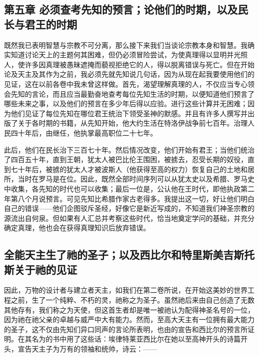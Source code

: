 
\subsection{第五章 必须查考先知的预言；论他们的时期，以及民长与君王的时期}

既然我已表明智慧与宗教不可分离，那么接下来我们当谈论宗教本身和智慧。我确实知道讨论天上的主题何其困难，但仍必须冒险尝试，为使真理得以显明并光照人，使许多因真理被愚昧遮掩而藐视拒绝它的人，得以脱离错误与死亡。但在开始论及天主及其作为之前，我必须先就先知说几句话，因为从现在起我要使用他们的见证，这在以前各卷中我未曾这样做。首先，渴望理解真理的人，不仅应当专心领会先知的言论，而且应当最勤奋地查考每位先知生活的时期，以便知道他们预言了哪些未来之事，以及他们的预言在多少年后得以应验。进行这些计算并无困难；因为他们见证了每位先知在哪位君王统治下领受圣神的默感。并且有许多人撰写并出版了关于各时期的书籍，从先知开始，他大约生活在特洛伊战争前七百年。治理人民四十年后，由继任，他执掌最高职位二十七年。\par

此后，他们在民长治下三百七十年。然后情况改变，他们开始有君王；当他们统治了四百五十年，直到王朝，犹太人被巴比伦王围困，被掳去，忍受长期的奴役，直到七十年后，被掳的犹太人才被波斯人（他获得至高的权力）恢复自己的土地和居所，当时在罗马是在位。因此，既然全部时间序列可以从犹太史以及希腊、罗马史中收集，各先知的时代也可以收集；最后一位是，公认他在王时代，即他执政第二年第八个月说预言。可见先知比希腊作家古老得多。我提出这一切，好让他们明白自己的错误——他们企图驳斥圣经，好像它是新近写成的，不知道我们神圣宗教的源流出自何泉。但如果有人汇总并考察这些时代，恰当地奠定学问的基础，并充分确定真理，他也会在获得真理知识后放弃错误。\par


\subsection{全能天主生了祂的圣子；以及西比尔和特里斯美吉斯托斯关于祂的见证}

因此，万物的设计者与建立者天主，如我们在第二卷所说，在开始这美妙的世界工程之前，生了一个纯粹、不朽的灵，祂称之为圣子。虽然祂后来由自己创造了无数其他存有，我们称之为天使，但这首生者却是唯一被祂认为配得神圣名号的一位，因为祂在祂父亲的卓越与威严中大有能力。然而，至高大天主有一位拥有最大能力的圣子，这不仅由先知们异口同声的言论所表明，也由的宣告和西比尔的预言所证明。在其名为的书中用了这些话：埃律特莱亚西比尔在她以至高神开头的诗篇开头，宣告天主子为万有的领袖和统帅，诗云：——\par

